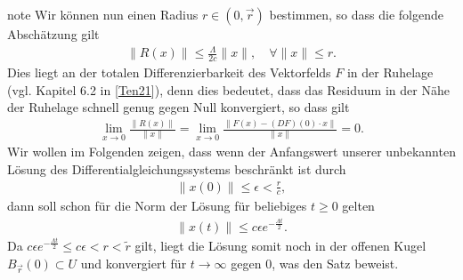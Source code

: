 \documentclass[letterpaper,10pt,english]{jupyterBook}
\begin{document}
\begin{sphinxadmonition}{note}
\sphinxAtStartPar
Wir können nun einen Radius \(r\in (0,\vec{r})\) bestimmen, so dass die folgende Abschätzung gilt
\begin{equation}\label{equation:ode_stability/ruhelagen:eq:abschaetzung_residuum}
\begin{split}\|R(x)\| \leq \frac{\Lambda}{2c} \|x\|, \quad \forall \|x\| \leq r.\end{split}
\end{equation}
\sphinxAtStartPar
Dies liegt an der totalen Differenzierbarkeit des Vektorfelds \(F\) in der Ruhelage (vgl. Kapitel 6.2 in {[}\hyperlink{cite.references:id12}{Ten21}{]}), denn dies bedeutet, dass das Residuum in der Nähe der Ruhelage schnell genug gegen Null konvergiert, so dass gilt
\begin{equation*}
\begin{split}\lim_{x\to 0} \frac{\|R(x)\|}{\|x\|} = \lim_{x\to 0}\frac{\|F(x)- (DF)(0)\cdot x\|}{\|x\|} = 0.\end{split}
\end{equation*}
\sphinxAtStartPar
Wir wollen im Folgenden zeigen, dass wenn der Anfangswert unserer unbekannten Lösung des Differentialgleichungssystems beschränkt ist durch
\begin{equation*}
\begin{split}\|x(0)\| \leq \epsilon <\frac{r}{c},\end{split}
\end{equation*}
\sphinxAtStartPar
dann soll schon für die Norm der Lösung für beliebiges \(t \geq 0\) gelten
\begin{equation*}
\begin{split}\|x(t)\| \leq c\epsilon e^{-\frac{\Lambda t}{2}}.\end{split}
\end{equation*}
\sphinxAtStartPar
Da \(c\epsilon e^{- \frac{\Lambda t}{2}} \leq c\epsilon < r <\tilde{r}\) gilt, liegt die Lösung somit noch in der offenen Kugel \(B_{\vec{r}}(0) \subset U\) und konvergiert für \(t \rightarrow \infty\) gegen 0, was den Satz beweist.


\end{sphinxadmonition}
\end{document}
